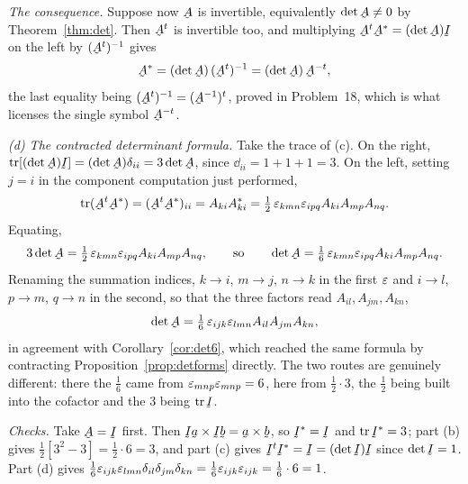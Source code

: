 \begin{solution}
\emph{The consequence.} Suppose now $\bA$ is invertible, equivalently
$\det\bA\neq0$ by Theorem~\ref{thm:det}. Then $\bA^{t}$ is invertible too,
and multiplying $\bA^{t}\bA^{*}=(\det\bA)\I$ on the left by $(\bA^{t})^{-1}$
gives
\[
   \bA^{*}=(\det\bA)\,(\bA^{t})^{-1}=(\det\bA)\,\bA^{-t},
\]
the last equality being $(\bA^{t})^{-1}=(\bA^{-1})^{t}$, proved in
Problem~18, which is what licenses the single symbol $\bA^{-t}$.

\medskip
\emph{(d) The contracted determinant formula.}
Take the trace of (c). On the right, $\tr[(\det\bA)\I]=(\det\bA)\dd_{ii}
=3\det\bA$, since $\dd_{ii}=1+1+1=3$. On the left, setting $j=i$ in the
component computation just performed,
\[
   \tr(\bA^{t}\bA^{*})=(\bA^{t}\bA^{*})_{ii}=A_{ki}A^{*}_{ki}
   =\tfrac12\,\eps_{kmn}\eps_{ipq}A_{ki}A_{mp}A_{nq}.
\]
Equating,
\[
   3\det\bA=\tfrac12\,\eps_{kmn}\eps_{ipq}A_{ki}A_{mp}A_{nq},
   \qquad\text{so}\qquad
   \det\bA=\tfrac16\,\eps_{kmn}\eps_{ipq}A_{ki}A_{mp}A_{nq}.
\]
Renaming the summation indices, $k\to i$, $m\to j$, $n\to k$ in the first
$\varepsilon$ and $i\to l$, $p\to m$, $q\to n$ in the second, so that the three
factors read $A_{il},A_{jm},A_{kn}$,
\[
   \det\bA=\tfrac16\,\eps_{ijk}\eps_{lmn}A_{il}A_{jm}A_{kn},
\]
in agreement with Corollary~\ref{cor:det6}, which reached the same formula
by contracting Proposition~\ref{prop:detforms} directly. The two routes are
genuinely different: there the $\tfrac16$ came from
$\varepsilon_{mnp}\varepsilon_{mnp}=6$, here from $\tfrac12\cdot 3$, the $\tfrac12$ being
built into the cofactor and the $3$ being $\tr\I$.

\medskip
\emph{Checks.} Take $\bA=\I$ first. Then $\I\ba\times\I\bb=\ba\times\bb$, so
$\I^{*}=\I$ and $\tr\I^{*}=3$; part (b) gives
$\tfrac12[3^{2}-3]=\tfrac12\cdot 6=3$, and part (c) gives
$\I^{t}\I^{*}=\I=(\det\I)\I$ since $\det\I=1$. Part (d) gives
$\tfrac16\varepsilon_{ijk}\varepsilon_{lmn}\delta_{il}\delta_{jm}\delta_{kn}
=\tfrac16\varepsilon_{ijk}\varepsilon_{ijk}=\tfrac16\cdot 6=1$.


\end{solution}
